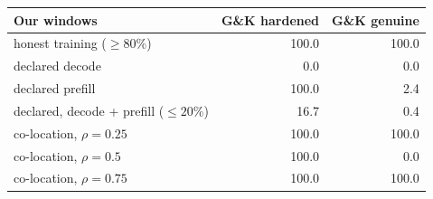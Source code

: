 \begin{tabular}{lrr}
\toprule
Our windows & G\&K hardened & G\&K genuine \\
\midrule
honest training ($\geq 80$\%) & 100.0 & 100.0 \\
declared decode & 0.0 & 0.0 \\
declared prefill & 100.0 & 2.4 \\
declared, decode + prefill ($\leq 20$\%) & 16.7 & 0.4 \\
\midrule
co-location, $\rho = 0.25$ & 100.0 & 100.0 \\
co-location, $\rho = 0.5$ & 100.0 & 0.0 \\
co-location, $\rho = 0.75$ & 100.0 & 100.0 \\
\bottomrule
\end{tabular}
